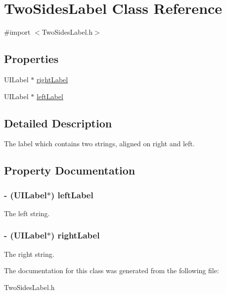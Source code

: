 \hypertarget{interface_two_sides_label}{\section{\-Two\-Sides\-Label \-Class \-Reference}
\label{interface_two_sides_label}
}


{\ttfamily \#import $<$\-Two\-Sides\-Label.\-h$>$}

\subsection*{\-Properties}
\begin{DoxyCompactItemize}
\item 
\-U\-I\-Label $\ast$ \hyperlink{interface_two_sides_label_a91d247769e9ab61c90583be8048c30e7}{right\-Label}
\item 
\-U\-I\-Label $\ast$ \hyperlink{interface_two_sides_label_ae2c5763f3d4b956e6572efb8af215605}{left\-Label}
\end{DoxyCompactItemize}


\subsection{\-Detailed \-Description}
\-The label which contains two strings, aligned on right and left. 

\subsection{\-Property \-Documentation}
\hypertarget{interface_two_sides_label_ae2c5763f3d4b956e6572efb8af215605}{
\subsubsection[{left\-Label}]{\setlength{\rightskip}{0pt plus 5cm}-\/ (\-U\-I\-Label$\ast$) {\bf left\-Label}}}\label{interface_two_sides_label_ae2c5763f3d4b956e6572efb8af215605}
\-The left string. \hypertarget{interface_two_sides_label_a91d247769e9ab61c90583be8048c30e7}{
\subsubsection[{right\-Label}]{\setlength{\rightskip}{0pt plus 5cm}-\/ (\-U\-I\-Label$\ast$) {\bf right\-Label}}}\label{interface_two_sides_label_a91d247769e9ab61c90583be8048c30e7}
\-The right string. 

\-The documentation for this class was generated from the following file\-:\begin{DoxyCompactItemize}
\item 
\-Two\-Sides\-Label.\-h\end{DoxyCompactItemize}
